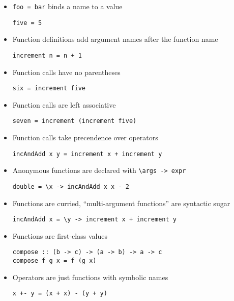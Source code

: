 \begin{itemize}
\item \verb|foo = bar| binds a name to a value
\begin{verbatim}
five = 5
\end{verbatim}

\item Function definitions add argument names after the function name
\begin{verbatim}
increment n = n + 1
\end{verbatim}

\item Function calls have no parentheses
\begin{verbatim}
six = increment five
\end{verbatim}

\item Function calls are left associative
\begin{verbatim}
seven = increment (increment five)
\end{verbatim}

\item Function calls take precendence over operators
\begin{verbatim}
incAndAdd x y = increment x + increment y
\end{verbatim}

\item Anonymous functions are declared with \verb|\args -> expr|
\begin{verbatim}
double = \x -> incAndAdd x x - 2
\end{verbatim}

\item Functions are curried, ``multi-argument functions'' are
  syntactic sugar
\begin{verbatim}
incAndAdd x = \y -> increment x + increment y
\end{verbatim}

\item Functions are first-class values
\begin{verbatim}
compose :: (b -> c) -> (a -> b) -> a -> c
compose f g x = f (g x)
\end{verbatim}

\item Operators are just functions with symbolic names
\begin{verbatim}
x +- y = (x + x) - (y + y)
\end{verbatim}


\end{itemize}
